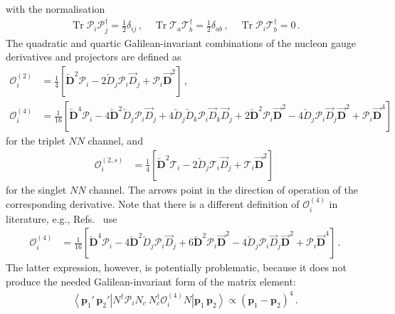 \documentclass[prl,
twocolumn,
showpacs,preprintnumbers,amsmath,amssymb,
superscriptaddress,
a4paper,nofootinbib,longbibliography]{revtex4-2}
\def\bv#1{\boldsymbol{#1}}
\DeclareMathOperator{\tr}{Tr}
\begin{document}
with the normalisation
\begin{align}
    \tr \mathcal{P}_i\mathcal{P}_j^\dagger = \frac{1}{2}\delta_{ij}\,, \quad  \tr \mathcal{T}_a\mathcal{T}_b^\dagger = \frac{1}{2}\delta_{ab}\,, \quad  \tr \mathcal{P}_i\mathcal{T}_b^\dagger = 0\,.
\end{align}
The quadratic and quartic Galilean-invariant combinations of the nucleon gauge derivatives and projectors are defined as
\begin{align}
\mathcal{O}_i^{(2)} &= \frac{1}{4}\left[
\overleftarrow{\bv{D}}^2\mathcal{P}_i -2 \overleftarrow{{ D}}_j\mathcal{P}_i\overrightarrow{{D}}_j + \mathcal{P}_i\overrightarrow{\bv{D}}^2
\right]
\,,
\label{eq:O2}
\\
\mathcal{O}_i^{(4)} &= \frac{1}{16}\left[
\overleftarrow{\bv{D}}^4 \mathcal{P}_i - 4\overleftarrow{\bv{D}}^2\overleftarrow{{D}}_j\mathcal{P}_i\overrightarrow{{D}}_j
+4\overleftarrow{{D}}_j\overleftarrow{{D}}_k \mathcal{P}_i \overrightarrow{{D}}_k \overrightarrow{{D}}_j +2\overleftarrow{\bv{D}}^2\mathcal{P}_i\overrightarrow{\bv{D}}^2
-4 \overleftarrow{{D}}_j\mathcal{P}_i \overrightarrow{{D}}_j\overrightarrow{\bv{D}}^2
+\mathcal{P}_i \overrightarrow{\bv{D}}^4
\right]\,
\label{eq:O4}
\end{align}
for the triplet $NN$ channel, and
\begin{align}
\mathcal{O}_i^{(2,s)} &= \frac{1}{4}\left[
\overleftarrow{\bv{D}}^2\mathcal{T}_i -2 \overleftarrow{{D}}_j\mathcal{T}_i\overrightarrow{{D}}_j + \mathcal{T}_i\overrightarrow{\bv{D}}^2
\right]
\,
\label{eq:02s}
\end{align}
for the singlet $NN$ channel. The arrows point in the direction of operation of the corresponding derivative.
Note that there is a different definition of $\mathcal{O}^{(4)}_i$ in literature, e.g., Refs.~\cite{Chen:1999bg,Rupak:1999rk} use
\begin{align}
\mathcal{O}_i^{(4)} &= \frac{1}{16}\left[
\overleftarrow{\bv{D}}^4 \mathcal{P}_i - 4\overleftarrow{\bv{D}}^2\overleftarrow{{D}}_j\mathcal{P}_i\overrightarrow{{D}}_j
+6\overleftarrow{\bv{D}}^2\mathcal{P}_i\overrightarrow{\bv{D}}^2
-4 \overleftarrow{{D}}_j\mathcal{P}_i \overrightarrow{{D}}_j\overrightarrow{\bv{D}}^2
+\mathcal{P}_i \overrightarrow{\bv{D}}^4
\right]\,.
\label{eq:O4nG}
\end{align}
The latter expression, however, is potentially problematic, because it does not produce the needed Galilean-invariant form of the matrix element:
\begin{align}
\left\langle \bv{p}_1'\, \bv{p}_2'\right|N^\dagger \mathcal{P}_i N_c\ N_c^\dagger \mathcal{O}_i^{(4)} N\left|\bv{p}_1\, \bv{p}_2\right\rangle \propto (\bv{p}_1-\bv{p}_2)^4\,.
\end{align}
\end{document}
